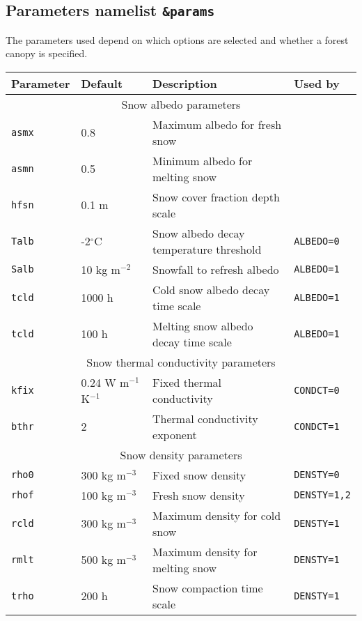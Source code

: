 \documentclass{article}
\begin{document}
\subsection{Parameters namelist {\tt \&params}}

The parameters used depend on which options are selected and whether a forest canopy is specified.

\begin{longtable}{|l|l|l|l|}
\hline
Parameter & Default & Description & Used by \\
\hline
\hline \multicolumn{4}{|c|}{Snow albedo parameters} \\
\hline 
{\tt asmx} & 0.8            & Maximum albedo for fresh snow           &               \\
{\tt asmn} & 0.5            & Minimum albedo for melting snow         &               \\
{\tt hfsn} & 0.1 m          & Snow cover fraction depth scale         &               \\
{\tt Talb} & -2$^\circ$C    & Snow albedo decay temperature threshold &{\tt ALBEDO=0} \\
{\tt Salb} & 10 kg m$^{-2}$ & Snowfall to refresh albedo              &{\tt ALBEDO=1} \\
{\tt tcld} & 1000 h         & Cold snow albedo decay time scale       &{\tt ALBEDO=1} \\
{\tt tcld} & 100 h          & Melting snow albedo decay time scale    &{\tt ALBEDO=1} \\
\hline 
\hline 
\multicolumn{4}{|c|}{Snow thermal conductivity parameters} \\
\hline 
{\tt kfix} & 0.24 W m$^{-1}$ K$^{-1}$ & Fixed thermal conductivity    &{\tt CONDCT=0} \\
{\tt bthr} & 2                        & Thermal conductivity exponent &{\tt CONDCT=1} \\
\hline
\hline
\multicolumn{4}{|c|}{Snow density parameters} \\
\hline 
{\tt rho0} & 300 kg m$^{-3}$ & Fixed snow density                     &{\tt DENSTY=0}   \\
{\tt rhof} & 100 kg m$^{-3}$ & Fresh snow density                     &{\tt DENSTY=1,2} \\
{\tt rcld} & 300 kg m$^{-3}$ & Maximum density for cold snow          &{\tt DENSTY=1}   \\
{\tt rmlt} & 500 kg m$^{-3}$ & Maximum density for melting snow       &{\tt DENSTY=1}   \\
{\tt trho} & 200 h           & Snow compaction time scale             &{\tt DENSTY=1}   \\

\end{longtable}
\end{document}
